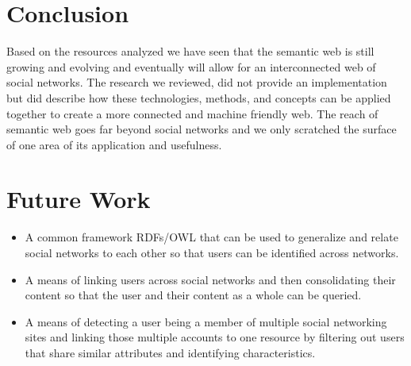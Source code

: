 \documentclass[10pt,journal,compsoc]{IEEEtran}
\begin{document}
\section{Conclusion}
Based on the resources analyzed we have seen that the semantic web is still growing and evolving and eventually will allow for an interconnected web of social networks. The research we reviewed, did not provide an implementation but did describe how these technologies, methods, and concepts can be applied together to create a more connected and machine friendly web. The reach of semantic web goes far beyond social networks and we only scratched the surface of one area of its application and usefulness.


\section{Future Work}
\begin{itemize}
\item
A common framework RDFs/OWL that can be used to generalize and relate social networks to each other so that users can be identified across networks.
\item
A means of linking users across social networks and then consolidating their content so that the user and their content as a whole can be queried.
\item
A means of detecting a user being a member of multiple social networking sites and linking those multiple accounts to one resource by filtering out users that share similar attributes and identifying characteristics.
\end{itemize}

%


\newpage

 
\nocite{*}

\end{document}
